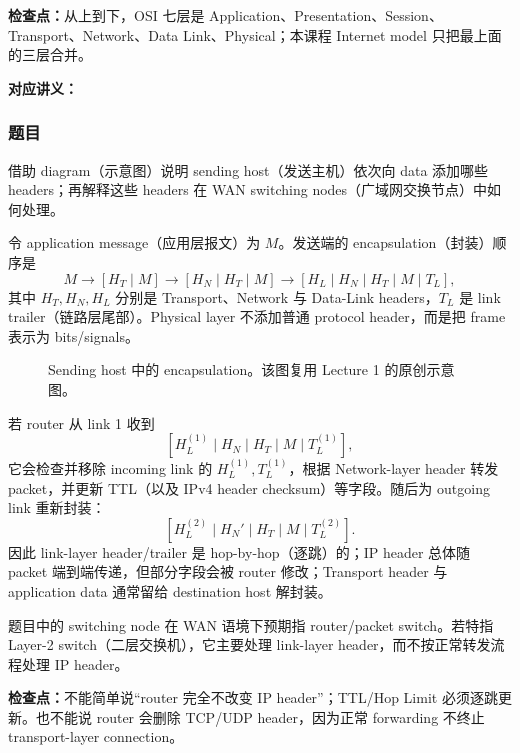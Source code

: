 \textbf{检查点：}从上到下，OSI 七层是 Application、Presentation、Session、Transport、Network、Data Link、Physical；本课程 Internet model 只把最上面的三层合并。


\textbf{对应讲义：}

\subsubsection*{题目}

借助 diagram（示意图）说明 sending host（发送主机）依次向 data 添加哪些 headers；再解释这些 headers 在 WAN switching nodes（广域网交换节点）中如何处理。

\begin{checkedsolution}
令 application message（应用层报文）为 $M$。发送端的 encapsulation（封装）顺序是
\[
  M
  \longrightarrow
  [H_T\mid M]
  \longrightarrow
  [H_N\mid H_T\mid M]
  \longrightarrow
  [H_L\mid H_N\mid H_T\mid M\mid T_L],
\]
其中 $H_T,H_N,H_L$ 分别是 Transport、Network 与 Data-Link headers，$T_L$ 是 link trailer（链路层尾部）。Physical layer 不添加普通 protocol header，而是把 frame 表示为 bits/signals。

\begin{figure}[htbp]
  \centering
  \resizebox{\textwidth}{!}{}
  \caption{Sending host 中的 encapsulation。该图复用 Lecture 1 的原创示意图。}
  \label{fig:sc2008-tut01-encapsulation}
\end{figure}

若 router 从 link 1 收到
\[
  [H_L^{(1)}\mid H_N\mid H_T\mid M\mid T_L^{(1)}],
\]
它会检查并移除 incoming link 的 $H_L^{(1)},T_L^{(1)}$，根据 Network-layer header 转发 packet，并更新 TTL（以及 IPv4 header checksum）等字段。随后为 outgoing link 重新封装：
\[
  [H_L^{(2)}\mid H_N'\mid H_T\mid M\mid T_L^{(2)}].
\]
因此 link-layer header/trailer 是 hop-by-hop（逐跳）的；IP header 总体随 packet 端到端传递，但部分字段会被 router 修改；Transport header 与 application data 通常留给 destination host 解封装。

题目中的 switching node 在 WAN 语境下预期指 router/packet switch。若特指 Layer-2 switch（二层交换机），它主要处理 link-layer header，而不按正常转发流程处理 IP header。
\end{checkedsolution}

\textbf{检查点：}不能简单说“router 完全不改变 IP header”；TTL/Hop Limit 必须逐跳更新。也不能说 router 会删除 TCP/UDP header，因为正常 forwarding 不终止 transport-layer connection。

